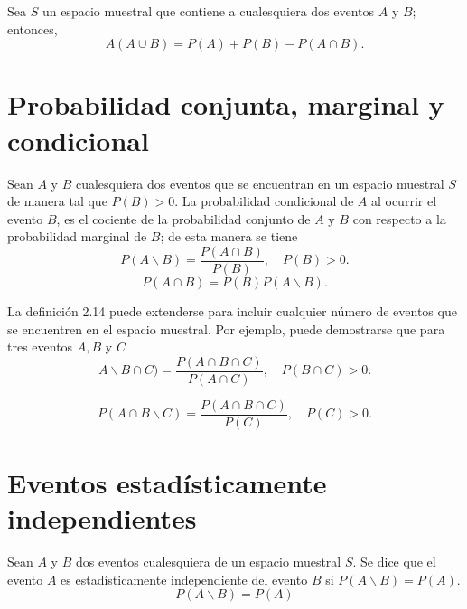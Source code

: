 \begin{teo} Sea $S$ un espacio muestral que contiene a cualesquiera dos eventos $A$ y $B$; entonces,
    $$A(A\cup B) = P(A) + P(B) - P(A\cap B).$$
\end{teo}

\section{Probabilidad conjunta, marginal y condicional}

\begin{tcolorbox}[colframe = white]
    \begin{def.} Sean $A$ y $B$ cualesquiera dos eventos que se encuentran en un espacio muestral $S$ de manera tal que $P(B)>0$. La probabilidad condicional de $A$ al ocurrir el evento $B$, es el cociente de la probabilidad conjunto de $A$ y $B$ con respecto a la probabilidad marginal de $B$; de esta manera se tiene
	\begin{equation}
	    P(A\backslash B) = \dfrac{P(A\cap B)}{P(B)}, \quad P(B)>0.
	\end{equation}
	\begin{equation}
	    P(A\cap B) = P(B)P(A\backslash B).
	\end{equation}
    \end{def.}
\end{tcolorbox}

La definición 2.14 puede extenderse para incluir cualquier número de eventos que se encuentren en el espacio muestral. Por ejemplo, puede demostrarse que para tres eventos $A,B$ y $C$
\begin{equation}
    A\backslash B\cap C) = \dfrac{P(A\cap B \cap C)}{P(A\cap C)}, \quad P(B\cap C)>0.
\end{equation}

\begin{equation}
    P(A\cap B \backslash C) = \dfrac{P(A\cap B \cap C)}{P(C)}, \quad P(C)>0.
\end{equation}

\section{Eventos estadísticamente independientes}

\begin{tcolorbox}[colframe = white]
    \begin{def.} Sean $A$ y $B$ dos eventos cualesquiera de un espacio muestral $S$. Se dice que el evento $A$ es estadísticamente independiente del evento $B$ si $P(A\backslash B) = P(A).$
	$$P(A \backslash B) = P(A)$$
    \end{def.}
\end{tcolorbox}


